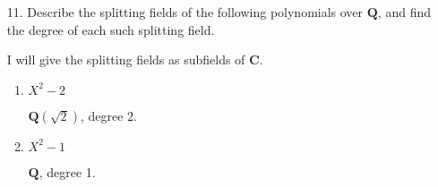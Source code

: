\documentclass[10pt]{article}
\newcommand{\Q}{\mathbf{Q}}
\newcommand{\R}{\mathbf{R}}
\newcommand{\C}{\mathbf{C}}
\begin{document}
\begin{enumerate}
\begin{enumerate}
\begin{proof}
The minimal polynomial of $i\alpha^2$ over $\Q$ is $X^2 + 5$, which splits completely as $(X + i\alpha^2)(X-i\alpha^2)$ over this extension.  Since this polynomial is irreducible, it does not split over any smaller extension (the only other is $\Q$), so this is the splitting field of $X^2 + 5$, hence is normal.
\end{proof}

\item Show that $\Q(\alpha + i\alpha)$ is normal over $\Q(i\alpha^2)$.

\begin{proof}
$\alpha + i\alpha$ satisfies $X^4 + 20$, since $(\alpha+i\alpha)^4 = \alpha^4(1+i)^4 = -20$.  However, over $\Q(i\alpha^2)$ this has a factor of $X^2+ 2i\alpha^2$, which is the minimal polynomial of $\alpha+i\alpha$ over $\Q(i\alpha^2)$.  However, this polynomial is irreducible, so $\Q(\alpha+i\alpha)$ is the splitting field of $X^2 + 2i\alpha^2$ over $\Q(i\alpha^2)$.
\end{proof}

\item Show that $\Q(\alpha + i\alpha)$ is not normal over $\Q$.

\begin{proof}
The minimum polynomial of $\alpha + i\alpha$ over $\Q$ is $X^4 + 20$, whose roots are $\pm \alpha \pm i\alpha$.  However, $\Q(\alpha + i\alpha)$ does not contain $\alpha - i\alpha$.  If it did, then it would also contain $\alpha$, and thus $i$ as well.  Since $\alpha$ has degree 4 over $\Q$, $\alpha \in \Q(\alpha + i\alpha)$ would mean $\Q(\alpha) = \Q(\alpha + i\alpha)$, and so $i \in \Q(\alpha) \subseteq \R$, a contradiction.  So this extension is not normal.
\end{proof}
\end{enumerate}

\item[11.] Describe the splitting fields of the following polynomials over $\Q$, and find the degree of each such splitting field.

\noindent I will give the splitting fields as subfields of $\C$.

\begin{enumerate}
\item $X^2 - 2$

\noindent $\Q(\sqrt{2})$, degree 2.

\item $X^2 - 1$

\noindent $\Q$, degree 1.


\end{enumerate}
\end{enumerate}
\end{document}
